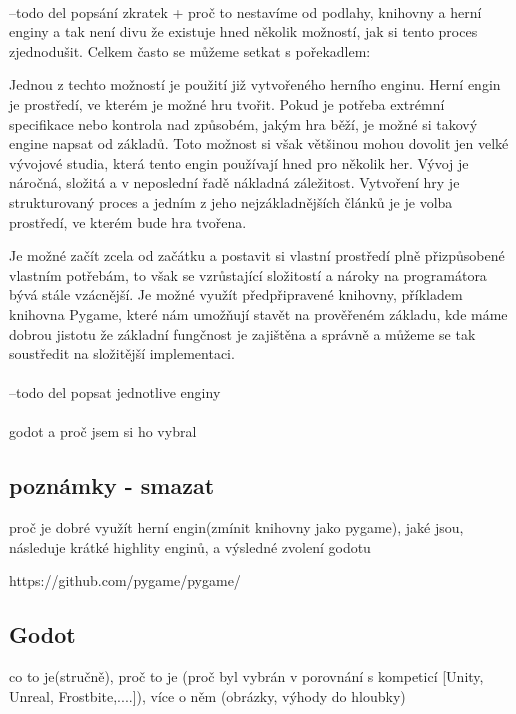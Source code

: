 \paragraph{}--todo del popsání zkratek + proč to nestavíme od podlahy, knihovny a herní enginy
	a tak není divu že existuje hned několik možností, jak si tento proces zjednodušit. Celkem často se můžeme setkat s pořekadlem:


	Jednou z techto možností je použití již vytvořeného herního enginu.
	Herní engin je prostředí, ve kterém je možné hru tvořit. Pokud je potřeba extrémní specifikace nebo kontrola nad způsobém, jakým hra běží, je možné si takový engine napsat od základů.
	Toto možnost si však většinou mohou dovolit jen velké vývojové studia, která tento engin používají hned pro několik her. Vývoj je náročná, složitá a v neposlední řadě nákladná záležitost.
	Vytvoření hry je strukturovaný proces a jedním z jeho nejzákladnějších článků je je volba prostředí, ve kterém bude hra tvořena.


	Je možné začít zcela od začátku a postavit si vlastní prostředí plně přizpůsobené vlastním potřebám, to však se vzrůstající složitostí a nároky na programátora bývá stále vzácnější.
	Je možné využít předpřipravené knihovny, příkladem knihovna Pygame\cite{pygame}, které nám umožňují stavět na prověřeném základu, kde máme dobrou jistotu že základní fungčnost je zajištěna a správně a můžeme se tak soustředit na složitější implementaci.

\paragraph{} --todo del popsat jednotlive enginy

\paragraph{} godot a proč jsem si ho vybral

	\subsection{poznámky - smazat}
	proč je dobré využít herní engin(zmínit knihovny jako pygame), jaké jsou, následuje krátké highlity enginů, a výsledné zvolení godotu

	https://github.com/pygame/pygame/

	\subsection{Godot}
	co to je(stručně), proč to je (proč byl vybrán  v porovnání s kompeticí [Unity, Unreal, Frostbite,....]), více o  něm (obrázky, výhody do hloubky)

